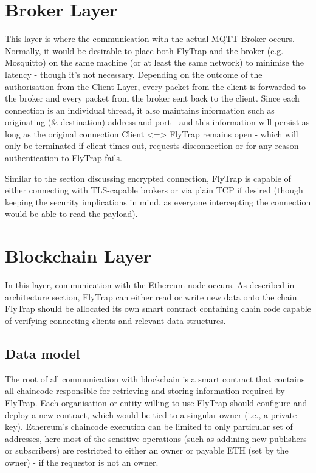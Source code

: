 \section{Broker Layer}

This layer is where the communication with the actual MQTT Broker occurs. Normally, it would be desirable to place both FlyTrap and the broker (e.g. Mosquitto) on the same machine (or at least the same network) to minimise the latency - though it's not necessary. Depending on the outcome of the authorisation from the Client Layer, every packet from the client is forwarded to the broker and every packet from the broker sent back to the client. Since each connection is an individual thread, it also maintains information such as originating (\& destination) address and port - and this information will persist as long as the original connection Client <=> FlyTrap remains open - which will only be terminated if client times out, requests disconnection or for any reason authentication to FlyTrap fails.

Similar to the section discussing encrypted connection, FlyTrap is capable of either connecting with TLS-capable brokers or via plain TCP if desired (though keeping the security implications in mind, as everyone intercepting the connection would be able to read the payload).

\section{Blockchain Layer}
In this layer, communication with the Ethereum node occurs. As described in architecture section, FlyTrap can either read or write new data onto the chain. FlyTrap should be allocated its own smart contract containing chain code capable of verifying connecting clients and relevant data structures. 
\subsection{Data model}
The root of all communication with blockchain is a smart contract that contains all chaincode responsible for retrieving and storing information required by FlyTrap. Each organisation or entity willing to use FlyTrap should configure and deploy a new contract, which would be tied to a singular owner (i.e., a private key). Ethereum's chaincode execution can be limited to only particular set of addresses, here most of the sensitive operations (such as addining new publishers or subscribers) are restricted to either an owner or payable ETH (set by the owner) - if the requestor is not an owner.

